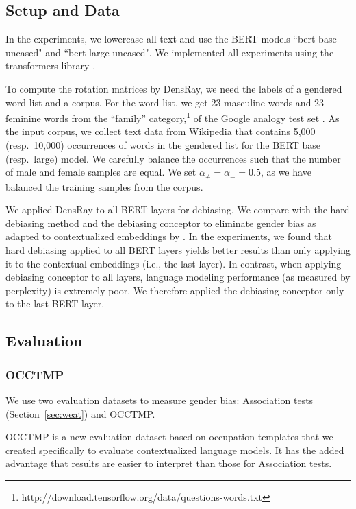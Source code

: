 \subsection{Setup and Data}
In the experiments, we lowercase all text and use the BERT models ``bert-base-uncased" and ``bert-large-uncased". We implemented all experiments using the transformers library \cite{wolf2019huggingfaces}.

To compute the rotation matrices by DensRay, we need the
labels of a gendered word list and a corpus. For the word
list, we get 23 masculine words and 23 feminine words from
the ``family''
category,\footnote{http://download.tensorflow.org/data/questions-words.txt}
of the Google analogy test set \cite{mikolov2013efficient}. As the input corpus, we collect text data from Wikipedia that contains 5,000 (resp.\ 10,000)
occurrences of words in the gendered list for the BERT base
(resp.\ large) model. We carefully balance the occurrences such that the number of male and female samples are equal. We set  $\alpha_{\neq}=\alpha_{=}=0.5$, as we have balanced the training samples from the corpus.

We applied DensRay to all BERT layers for debiasing. We
compare with the hard debiasing method \cite{mu2018all} and
the debiasing conceptor \cite{karve2019conceptor} to
eliminate gender bias as adapted to contextualized
embeddings by \cite{karve2019conceptor}. In the experiments, we found that hard debiasing applied to all BERT layers
yields better results than only applying it to the contextual
embeddings (i.e., the last layer). In contrast, when applying debiasing conceptor
to all layers, language modeling performance (as measured by
perplexity) is extremely poor.
We therefore applied the
debiasing conceptor only to the last BERT layer.

\subsection{Evaluation}
\subsubsection{OCCTMP}
We use two evaluation datasets to measure gender bias: Association tests (Section~\ref{sec:weat}) and OCCTMP.

OCCTMP is a new evaluation dataset based on occupation templates
that we created specifically to evaluate contextualized language models.  It has the added advantage that results are easier to interpret than those for Association tests.

